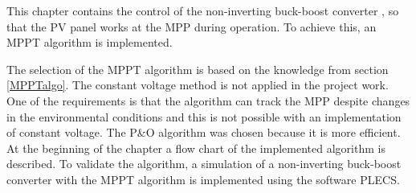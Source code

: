 This chapter contains the control of the non-inverting buck-boost converter , so that the PV panel works at the MPP during operation. To achieve this, an MPPT algorithm is implemented.

The selection of the MPPT algorithm is based on the knowledge from section  \ref{MPPTalgo}.
The constant voltage method is not applied in the project work. One of the requirements is that the algorithm can track the MPP despite changes in the environmental conditions and this is not possible with an implementation of constant voltage. The P\&O algorithm was chosen because it is more efficient. %
At the beginning of the chapter a flow chart of the implemented algorithm is described. To validate the algorithm, a simulation of a non-inverting buck-boost converter with the MPPT algorithm is implemented using the software PLECS. 
